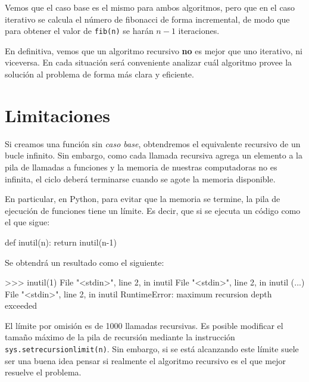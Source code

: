 Vemos que el caso base es el mismo para ambos algoritmos, pero que en el
caso iterativo se calcula el número de fibonacci de forma incremental, de
modo que para obtener el valor de \lstinline!fib(n)! se harán $n-1$
iteraciones.

\begin{atencion}
En definitiva, vemos que un algoritmo recursivo {\bf no} es mejor que uno
iterativo, ni viceversa.  En cada situación será conveniente analizar cuál
algoritmo provee la solución al problema de forma más clara y eficiente.
\end{atencion}

\section{Limitaciones}

Si creamos una función sin {\it caso base}, obtendremos el equivalente
recursivo de un bucle infinito.  Sin embargo, como cada llamada recursiva
agrega un elemento a la pila de llamadas a funciones y la memoria de
nuestras computadoras no es infinita, el ciclo deberá terminarse cuando se
agote la memoria disponible.

En particular, en Python, para evitar que la memoria se termine, la pila de
ejecución de funciones tiene un límite. Es decir, que si se ejecuta un
código como el que sigue:

\begin{codigo-python-sn}
def inutil(n):
    return inutil(n-1)
\end{codigo-python-sn}

Se obtendrá un resultado como el siguiente:

\begin{codigo-python-sn}
>>> inutil(1)
  File "<stdin>", line 2, in inutil
  File "<stdin>", line 2, in inutil
  (...)
  File "<stdin>", line 2, in inutil
RuntimeError: maximum recursion depth exceeded
\end{codigo-python-sn}

El límite por omisión es de 1000 llamadas recursivas. Es posible modificar
el tamaño máximo de la pila de recursión mediante la instrucción
\lstinline!sys.setrecursionlimit(n)!.  Sin embargo, si se está alcanzando
este límite suele ser una buena idea pensar si realmente el algoritmo
recursivo es el que mejor resuelve el problema.

